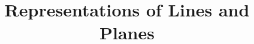 \documentclass{ximera}
\title{Representations of Lines and Planes}
\begin{document}
  
\begin{abstract}  
\end{abstract}  
\maketitle 
\end{document}
